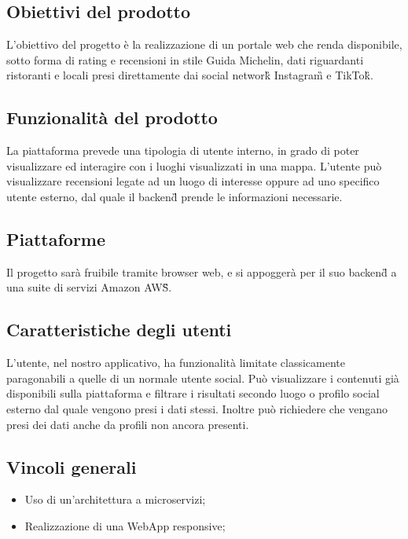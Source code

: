 \subsection{Obiettivi del prodotto}
L'obiettivo del progetto è la realizzazione di un portale web che renda disponibile, 
sotto forma di rating e recensioni in stile Guida Michelin, dati riguardanti ristoranti 
e locali presi direttamente dai social network\G{} Instagram\G{} e TikTok\G{}.

\subsection{Funzionalità del prodotto}
La piattaforma prevede una tipologia di utente interno, in grado di poter visualizzare ed interagire con i luoghi visualizzati in una mappa. 
L’utente può visualizzare recensioni legate ad un luogo di interesse oppure ad uno specifico utente esterno, dal quale il backend\G{} prende le informazioni necessarie.

\subsection{Piattaforme}
Il progetto sarà fruibile tramite browser web, e si appoggerà per il suo backend\G{} a una suite di servizi Amazon AWS\G{}.

\subsection{Caratteristiche degli utenti}
L'utente, nel nostro applicativo, ha funzionalità limitate classicamente paragonabili a quelle di un normale utente social.
Può visualizzare i contenuti già disponibili sulla piattaforma e filtrare i risultati secondo luogo o profilo social esterno dal quale vengono presi i dati stessi.
Inoltre può richiedere che vengano presi dei dati anche da profili non ancora presenti.

\subsection{Vincoli generali}
\begin{itemize}
	\item Uso di un'architettura a microservizi;
	\item Realizzazione di una WebApp responsive;
\end{itemize}
